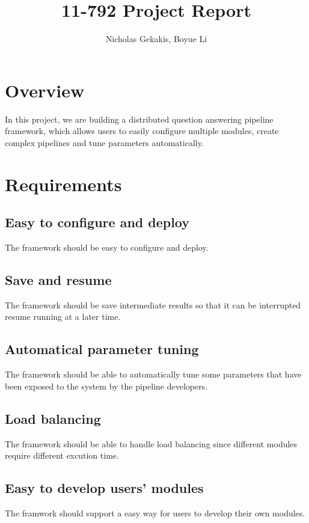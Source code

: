 \documentclass{article}
\begin{document}
\title{11-792 Project Report}

\author{Nicholas Gekakis, Boyue Li}

\maketitle

\section{Overview}

In this project, we are building a distributed question answering pipeline framework,
which allows users to easily configure multiple modules,
create complex pipelines and tune parameters automatically.

\section{Requirements}

    \subsection{Easy to configure and deploy}
    The framework should be easy to configure and deploy.

    \subsection{Save and resume}
    The framework should be save intermediate results so that it can be interrupted resume running at a later time.

    \subsection{Automatical parameter tuning}
    The framework should be able to automatically tune some parameters that have been exposed to the system by the pipeline developers.
    \subsection{Load balancing}
    The framework should be able to handle load balancing since different modules require different excution time.

    \subsection{Easy to develop users' modules}
    The framwork should support a easy way for users to develop their own modules.
\end{document}

